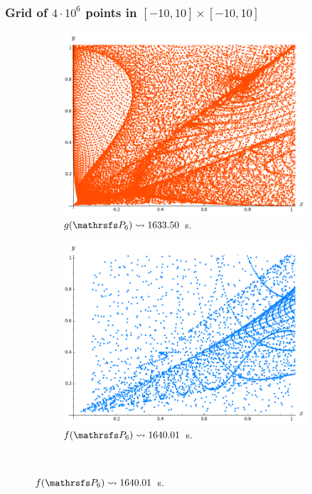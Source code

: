 \documentclass{beamer}
\begin{document}
\begin{frame}
\frametitle{Grid of $4\cdot 10^6$ points in $[-10, 10] \times [-10, 10]$}

\begin{figure}
\vspace{-0.2cm}
\begin{subfigure}{.38\linewidth}\centering
\includegraphics[width=1\textwidth]{plots/ch5_17_P6prime.png}
\vspace{-0.1cm}\caption{$g(\PP_6)\leadsto 1633.50$ s.}
\end{subfigure}
\hspace{0.8cm}
\begin{subfigure}{.38\linewidth}\centering
\includegraphics[width=1\textwidth]{plots/ch5_20_P6prime.png}
\vspace{-0.1cm}\caption{$f(\PP_6)\leadsto 1640.01$ s.}
\end{subfigure}\\[1ex]


\end{figure}
\end{frame}
\end{document}
